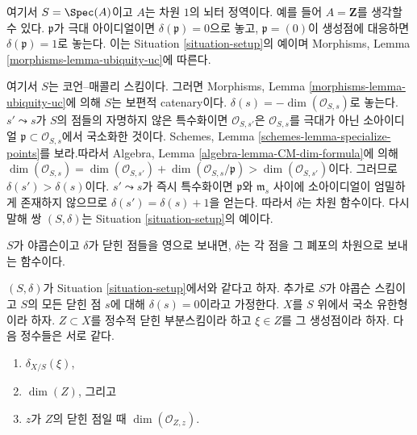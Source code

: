 \begin{example}
\label{example-domain-dimension-1}
여기서 $S = \Spec(A)$이고 $A$는 차원 $1$의 뇌터 정역이다. 예를 들어
$A = \mathbf{Z}$를 생각할 수 있다. $\mathfrak p$가 극대 아이디얼이면
$\delta(\mathfrak p) = 0$으로 놓고, $\mathfrak p = (0)$이 생성점에
대응하면 $\delta(\mathfrak p) = 1$로 놓는다. 이는 Situation
\ref{situation-setup}의 예이며 Morphisms, Lemma
\ref{morphisms-lemma-ubiquity-uc}에 따른다.
\end{example}

\begin{example}
\label{example-CM-irreducible}
여기서 $S$는 코언--매콜리 스킴이다. 그러면 Morphisms, Lemma
\ref{morphisms-lemma-ubiquity-uc}에 의해 $S$는 보편적 catenary이다.
$\delta(s) = -\dim(\mathcal{O}_{S, s})$로 놓는다.
$s' \leadsto s$가 $S$의 점들의 자명하지 않은 특수화이면
$\mathcal{O}_{S, s'}$은 $\mathcal{O}_{S, s}$를 극대가 아닌 소아이디얼
$\mathfrak p \subset \mathcal{O}_{S, s}$에서 국소화한 것이다. Schemes,
Lemma \ref{schemes-lemma-specialize-points}를 보라.따라서 Algebra, Lemma \ref{algebra-lemma-CM-dim-formula}에 의해
$\dim(\mathcal{O}_{S, s}) =
\dim(\mathcal{O}_{S, s'}) + \dim(\mathcal{O}_{S, s}/\mathfrak p) >
\dim(\mathcal{O}_{S, s'})$이다. 그러므로
$\delta(s') > \delta(s)$이다. $s' \leadsto s$가 즉시 특수화이면
$\mathfrak p$와 $\mathfrak m_s$ 사이에 소아이디얼이 엄밀하게 존재하지
않으므로 $\delta(s') = \delta(s) + 1$을 얻는다. 따라서 $\delta$는
차원 함수이다. 다시 말해 쌍 $(S, \delta)$는 Situation
\ref{situation-setup}의 예이다.
\end{example}

\noindent
$S$가 야콥슨이고 $\delta$가 닫힌 점들을 영으로 보내면, $\delta$는
각 점을 그 폐포의 차원으로 보내는 함수이다.

\begin{lemma}
\label{lemma-delta-is-dimension}
$(S, \delta)$가 Situation \ref{situation-setup}에서와 같다고 하자.
추가로 $S$가 야콥슨 스킴이고 $S$의 모든 닫힌 점 $s$에 대해
$\delta(s) = 0$이라고 가정한다. $X$를 $S$ 위에서 국소 유한형이라
하자. $Z \subset X$를 정수적 닫힌 부분스킴이라 하고
$\xi \in Z$를 그 생성점이라 하자. 다음 정수들은 서로 같다.
\begin{enumerate}
\item $\delta_{X/S}(\xi)$,
\item $\dim(Z)$, 그리고
\item $z$가 $Z$의 닫힌 점일 때 $\dim(\mathcal{O}_{Z, z})$.
\end{enumerate}
\end{lemma}

